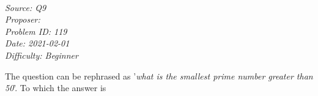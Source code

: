 \SSbreak\\
\emph{Source:  Q9}\\
\emph{Proposer: \Pss}\\
\emph{Problem ID: 119}\\
\emph{Date: 2021-02-01}\\
\emph{Difficulty: Beginner}\\
\SSbreak
 
\bigskip

\begin{solution}\hfil\medskip
  
The question can be rephrased as '\emph{what is the smallest prime number greater than 50}'. To which the answer is 
\end{solution}\bigskip
